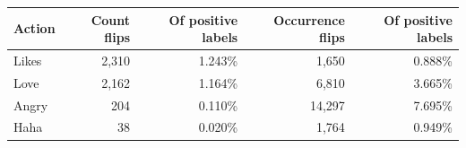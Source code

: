 \begin{tabular}{lrrrr}
\toprule
Action & Count flips & Of positive labels & Occurrence flips & Of positive labels \\
\midrule
Likes & 2,310 & 1.243\% & 1,650 & 0.888\% \\
Love & 2,162 & 1.164\% & 6,810 & 3.665\% \\
Angry & 204 & 0.110\% & 14,297 & 7.695\% \\
Haha & 38 & 0.020\% & 1,764 & 0.949\% \\
\bottomrule
\end{tabular}

